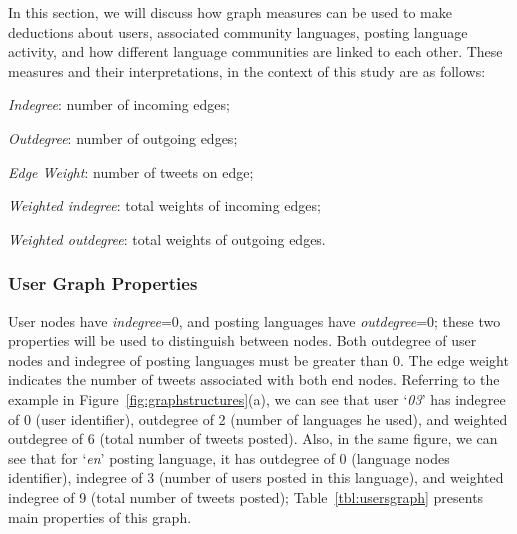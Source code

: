 \documentclass{llncs}
\begin{document}
In this section, we will discuss how graph measures can be used to
make deductions about users, associated community languages, posting
language activity, and how different language communities are linked
to each other.  These measures and their interpretations, in the
context of this study are as follows:\\

\begin{compactitem}
\item \emph{Indegree}: number of incoming edges;
\item \emph{Outdegree}: number of outgoing edges;
\item \emph{Edge Weight}: number of tweets on edge;
\item \emph{Weighted indegree}: total weights of incoming edges;
\item \emph{Weighted outdegree}: total weights of outgoing edges.
\end{compactitem}

\subsubsection{User Graph Properties}

User nodes have {\emph{indegree}}=0, and posting languages have
{\emph{outdegree}}=0; these two properties will be used to distinguish
between nodes. Both outdegree of user nodes and indegree of posting
languages must be greater than 0. The edge weight indicates the number
of tweets associated with both end nodes. Referring to the example in
Figure~\ref{fig:graphstructures}(a), we can see that user
`{\emph{03}}' has indegree of 0 (user identifier), outdegree of 2
(number of languages he used), and weighted outdegree of 6 (total
number of tweets posted). Also, in the same figure, we can see that
for `{\emph{en}}' posting language, it has outdegree of 0 (language
nodes identifier), indegree of 3 (number of users posted in this
language), and weighted indegree of 9 (total number of tweets posted);
Table~\ref{tbl:usersgraph} presents main properties of this graph.
\end{document}
